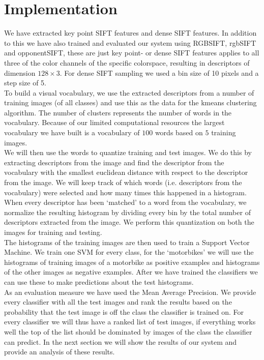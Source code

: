 \documentclass[11pt]{article}
\begin{document}
\section{Implementation}
We have extracted key point SIFT features and dense SIFT features. In addition to this we have also trained and evaluated our system using RGBSIFT, rgbSIFT and opponentSIFT, these are just key point- or dense SIFT features applies to all three of the color channels of the specific colorspace, resulting in descriptors of dimension $128\times3$. For dense SIFT sampling we used a bin size of 10 pixels and a step size of 5. \\
To build a visual vocabulary, we use the extracted descriptors from a number of training images (of all classes) and use this as the data for the kmeans clustering algorithm. The number of clusters represents the number of words in the vocabulary. Because of our limited computational resources the largest vocabulary we have built is a vocabulary of $100$ words based on $5$ training images. \\
We will then use the words to quantize training and test images. We do this by extracting descriptors from the image and find the descriptor from the vocabulary with the smallest euclidean distance with respect to the descriptor from the image. We will keep track of which words (i.e. descriptors from the vocabulary) were selected and how many times this happened in a histogram. When every descriptor has been `matched' to a word from the vocabulary, we normalize the resulting histogram by dividing every bin by the total number of descriptors extracted from the image. We perform this quantization on both the images for training and testing. \\
The histograms of the training images are then used to train a Support Vector Machine. We train one SVM for every class, for the `motorbikes' we will use the histograms of training images of a motorbike as positive examples and histograms of the other images as negative examples. After we have trained the classifiers we can use these to make predictions about the test histograms.\\
As an evaluation measure we have used the Mean Average Precision. We provide every classifier with all the test images and rank the results based on the probability that the test image is off the class the classifier is trained on. For every classifier we will thus have a ranked list of test images, if everything works well the top of the list should be dominated by images of the class the classifier can predict. In the next section we will show the results of our system and provide an analysis of these results. 
\end{document}
